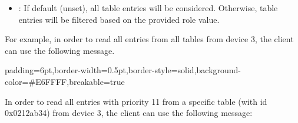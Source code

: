 \documentclass[11pt]{article}
\begin{document}
{\begin{itemize}[noitemsep,topsep=\mdcompacttopsep]
\item{}: If default (unset), all table entries will be considered. Otherwise,
table entries will be filtered based on the provided role value.%
\end{itemize}%

\noindent{}For example, in order to read all entries from all tables from device 3, the
client can use the following  message.%

\begin{mdbmargintb}{6pt}{6pt}%
\begin{mdblock}{padding=6pt,border-width=0.5pt,border-style=solid,background-color=\#E6FFFF,breakable=true}%
\begin{mdpre}%
\end{mdpre}%
\end{mdblock}%
\end{mdbmargintb}%

\noindent{}In order to read all entries with priority 11 from a specific table (with id
0x0212ab34) from device 3, the client can use the following 
message:%

}
\end{document}
